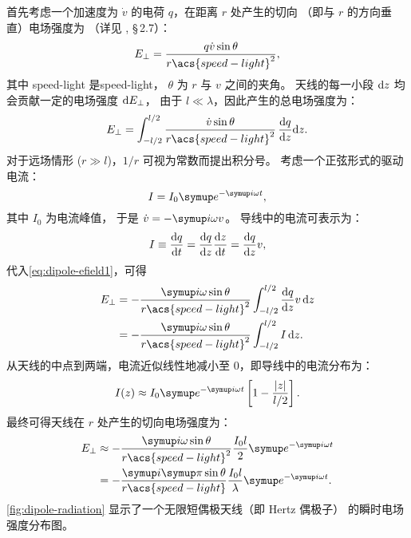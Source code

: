 首先考虑一个加速度为 $\dot{v}$ 的电荷 $q$，在距离 $r$ 处产生的切向
（即与 $r$ 的方向垂直）电场强度为
（详见 , \S\,2.7）：
\begin{equation}
  \label{eq:q-efield}
  E_{\perp} = \frac{q \dot{v} \sin\theta}{r \acs{speed-light}^2} ,
\end{equation}
其中
\acs{speed-light} 是\acl{speed-light}，
$\theta$ 为 $r$ 与 $v$ 之间的夹角。
天线的每一小段 $\mathrm{d}z$ 均会贡献一定的电场强度 $\mathrm{d}E_{\perp}$，
由于 $l \ll \lambda$，因此产生的总电场强度为：
\begin{equation}
  \label{eq:dipole-efield1}
  E_{\perp} = \int_{-l/2}^{l/2}
    \frac{\dot{v} \sin\theta}{r \acs{speed-light}^2} \,\diff{q}{z}\D{z} .
\end{equation}
对于远场情形 ($r \gg l$)，$1/r$ 可视为常数而提出积分号。
考虑一个正弦形式的驱动电流：
\begin{equation}
  \label{eq:dipole-current}
  I = I_0 \Ce^{-\Ci \omega t} ,
\end{equation}
其中 $I_0$ 为电流峰值，
于是 $\dot{v} = -\Ci \omega v$。
导线中的电流可表示为：
\begin{equation}
  \label{eq:wire-current}
  I \equiv \frac{\mathrm{d}q}{\mathrm{d}t} = \frac{\mathrm{d}q}{\mathrm{d}z} \frac{\mathrm{d}z}{\mathrm{d}t} = \frac{\mathrm{d}q}{\mathrm{d}z} v ,
\end{equation}
代入\autoref{eq:dipole-efield1}，可得
\begin{align}
  \label{eq:dipole-efield2}
  E_{\perp}
    & = -\frac{\Ci\omega \sin\theta}{r \acs{speed-light}^2}
      \int_{-l/2}^{l/2} \diff{q}{z} v \,\D{z} \\
    & = -\frac{\Ci\omega \sin\theta}{r \acs{speed-light}^2}
      \int_{-l/2}^{l/2} I\,\D{z} .
\end{align}
从天线的中点到两端，电流近似线性地减小至 0，即导线中的电流分布为：
\begin{equation}
  \label{eq:dipole-current-dist}
  I(z) \approx I_0 \Ce^{-\Ci\omega t}
    \left[ 1 - \frac{|z|}{l/2} \right] .
\end{equation}
最终可得天线在 $r$ 处产生的切向电场强度为：
\begin{align}
  E_{\perp}
    & \approx -\frac{\Ci\omega \sin\theta}{r \acs{speed-light}^2}
      \frac{I_0 l}{2} \Ce^{-\Ci\omega t} \\
    & = -\frac{\Ci\Cpi \sin\theta}{r \acs{speed-light}}
      \frac{I_0 l}{\lambda} \Ce^{-\Ci\omega t} .
    \label{eq:dipole-efield}
\end{align}
\autoref{fig:dipole-radiation} 显示了一个无限短偶极天线（即 Hertz 偶极子）
的瞬时电场强度分布图。

